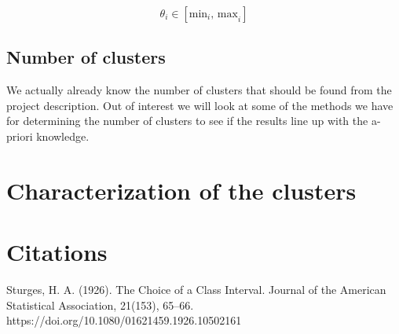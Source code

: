 \documentclass[12pt, a4paper]{article}
\begin{document}
\[\theta_i \in \left[\text{min}_i \text{, max}_i\right]\]

\subsection{Number of clusters}

We actually already know the number of clusters that should be found from the project description. Out of interest we will look at some of the methods we have for determining the number of clusters to see if the results line up with the a-priori knowledge.

\section{Characterization of the clusters}

\section{Citations}

Sturges, H. A. (1926). The Choice of a Class Interval. Journal of the American Statistical Association, 21(153), 65–66. https://doi.org/10.1080/01621459.1926.10502161
\newline
\end{document}
